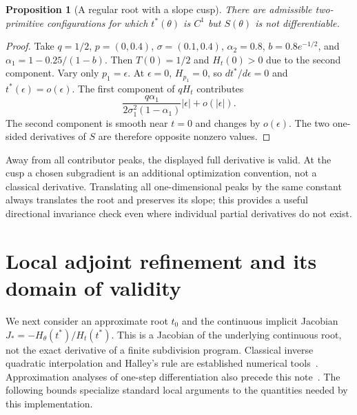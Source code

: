 \documentclass[11pt,a4paper]{article}
\newtheorem{proposition}[theorem]{Proposition}
\begin{document}
\begin{proposition}[A regular root with a slope cusp]
There are admissible two-primitive configurations for which $t^*(\theta)$ is
$C^1$ but $S(\theta)$ is not differentiable.
\end{proposition}
\begin{proof}
Take $q=1/2$, $p=(0,0.4)$, $\sigma=(0.1,0.4)$, $\alpha_2=0.8$,
$b=0.8e^{-1/2}$, and $\alpha_1=1-0.25/(1-b)$.
Then $T(0)=1/2$ and $H_t(0)>0$ due to the second component.
Vary only $p_1=\epsilon$. At $\epsilon=0$, $H_{p_1}=0$, so
$dt^*/d\epsilon=0$ and $t^*(\epsilon)=o(\epsilon)$.
The first component of $qH_t$ contributes
\[
 \frac{q\alpha_1}{2\sigma_1^2(1-\alpha_1)}
 |\epsilon|+o(|\epsilon|).
\]
The second component is smooth near $t=0$ and changes by $o(\epsilon)$.
The two one-sided derivatives of $S$ are therefore opposite nonzero values.
\end{proof}
Away from all contributor peaks, the displayed full derivative is valid.
At the cusp a chosen subgradient is an additional optimization convention,
not a classical derivative. Translating all one-dimensional peaks by the
same constant always translates the root and preserves its slope; this
provides a useful directional invariance check even where individual
partial derivatives do not exist.

\section{Local adjoint refinement and its domain of validity}
We next consider an approximate root $t_0$ and the continuous implicit
Jacobian $J_*=-H_\theta(t^*)/H_t(t^*)$. This is a Jacobian of the
underlying continuous root, not the exact derivative of a finite
subdivision program. Classical inverse quadratic interpolation and
Halley's rule are established numerical tools~\cite{brentdocs,dlmf}.
Approximation analyses of one-step differentiation also precede this
note~\cite{onestep}. The following bounds specialize standard local
arguments to the quantities needed by this implementation.
\end{document}
